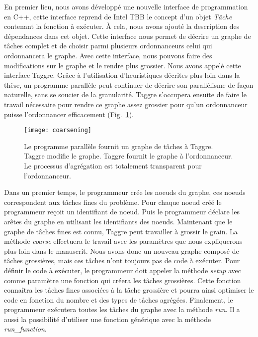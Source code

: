 En premier lieu, nous avons développé une nouvelle interface de programmation en C++, cette interface reprend de Intel TBB le concept d'un objet {\em Tâche} contenant la fonction à exécuter.
%
\`A cela, nous avons ajouté la description des dépendances dans cet objet.
%
Cette interface nous permet de décrire un graphe de tâches complet et de choisir parmi plusieurs ordonnanceurs celui qui ordonnancera le graphe.
%
Avec cette interface, nous pouvons faire des modifications sur le graphe et le rendre plus grossier.
%
Nous avons appelé cette interface Taggre.
%
Grâce à l'utilisation d'heuristiques décrites plus loin dans la thèse, un programme parallèle peut continuer de décrire son parallélisme de façon naturelle, sans se soucier de la granularité.
%
Taggre s'occupera ensuite de faire le travail nécessaire pour rendre ce graphe assez grossier pour qu'un ordonnanceur puisse l'ordonnancer efficacement (Fig.~\ref{fig:coarsening}).
\begin{figure}
  \centering
  \texttt{[image: coarsening]}
  \caption{Le programme parallèle fournit un graphe de tâches à Taggre. Taggre modifie le graphe. Taggre fournit le graphe à l'ordonnanceur. Le processus d'agrégation est totalement transparent pour l'ordonnanceur.}
  \label{fig:coarsening}
\end{figure}





Dans un premier temps, le programmeur crée les noeuds du graphe, ces noeuds correspondent aux tâches fines du problème.
%
Pour chaque noeud créé le programmeur reçoit un identifiant de noeud.
%
Puis le programmeur déclare les arêtes du graphe en utilisant les identifiants des noeuds.
%
Maintenant que le graphe de tâches fines est connu, Taggre peut travailler à grossir le grain.
%
La méthode {\em coarse} effectuera le travail avec les paramètres que nous expliquerons plus loin dans le manuscrit.
%
Nous avons donc un nouveau graphe composé de tâches grossières, mais ces tâches n'ont toujours pas de code à exécuter.
%
Pour définir le code à exécuter, le programmeur doit appeler la méthode {\em setup} avec comme paramètre une fonction qui créera les tâches grossières.
%
Cette fonction connaîtra les tâches fines associées à la tâche grossière et pourra ainsi optimiser le code en fonction du nombre et des types de tâches agrégées.
%
Finalement, le programmeur exécutera toutes les tâches du graphe avec la méthode {\em run}.
%
Il a aussi la possibilité d'utiliser une fonction générique avec la méthode {\em run\_function}.
